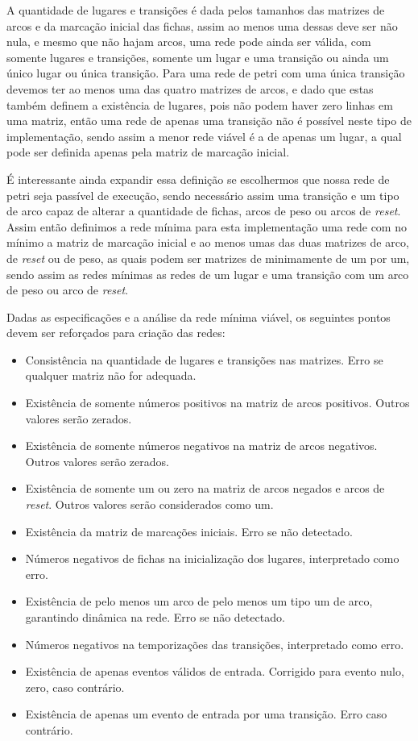 A quantidade de lugares e transições é dada pelos tamanhos das matrizes de arcos e da marcação inicial das fichas, assim ao menos uma dessas deve ser não nula, e mesmo que não hajam arcos, uma rede pode ainda ser válida, com somente lugares e transições, somente um lugar e uma transição ou ainda um único lugar ou única transição. Para uma rede de petri com uma única transição devemos ter ao menos uma das quatro matrizes de arcos, e dado que estas também definem a existência de lugares, pois não podem haver zero linhas em uma matriz, então uma rede de apenas uma transição não é possível neste tipo de implementação, sendo assim a menor rede viável é a de apenas um lugar, a qual pode ser definida apenas pela matriz de marcação inicial.

É interessante ainda expandir essa definição se escolhermos que nossa rede de petri seja passível de execução, sendo necessário assim uma transição e um tipo de arco capaz de alterar a quantidade de fichas, arcos de peso ou arcos de \textit{reset}. Assim então definimos a rede mínima para esta implementação uma rede com no mínimo a matriz de marcação inicial e ao menos umas das duas matrizes de arco, de \textit{reset} ou de peso, as quais podem ser matrizes de minimamente de um por um, sendo assim as redes mínimas as redes de um lugar e uma transição com um arco de peso ou arco de \textit{reset}. 


Dadas as especificações e a análise da rede mínima viável, os seguintes pontos devem ser reforçados para criação das redes:

\begin{itemize}
	\item Consistência na quantidade de lugares e transições nas matrizes. Erro se qualquer matriz não for adequada.
	\item Existência de somente números positivos na matriz de arcos positivos. Outros valores serão zerados.
	\item Existência de somente números negativos na matriz de arcos negativos. Outros valores serão zerados.
	\item Existência de somente um ou zero na matriz de arcos negados e arcos de \textit{reset}. Outros valores serão considerados como um.
	\item Existência da matriz de marcações iniciais. Erro se não detectado.
	\item Números negativos de fichas na inicialização dos lugares, interpretado como erro.
	\item Existência de pelo menos um arco de pelo menos um tipo um de arco, garantindo dinâmica na rede. Erro se não detectado.
	\item Números negativos na temporizações das transições, interpretado como erro.
	\item Existência de apenas eventos válidos de entrada. Corrigido para evento nulo, zero, caso contrário.
	\item Existência de apenas um evento de entrada por uma transição. Erro caso contrário.
\end{itemize}

